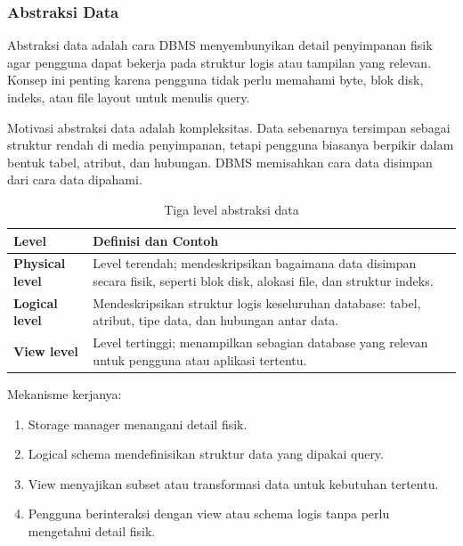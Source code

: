 \subsubsection{Abstraksi Data}

\begin{jawab}
Abstraksi data adalah cara DBMS menyembunyikan detail penyimpanan fisik agar pengguna dapat bekerja pada struktur logis atau tampilan yang relevan. Konsep ini penting karena pengguna tidak perlu memahami byte, blok disk, indeks, atau file layout untuk menulis query.
\end{jawab}

Motivasi abstraksi data adalah kompleksitas. Data sebenarnya tersimpan sebagai struktur rendah di media penyimpanan, tetapi pengguna biasanya berpikir dalam bentuk tabel, atribut, dan hubungan. DBMS memisahkan cara data disimpan dari cara data dipahami.

\begin{table}[H]
\centering
\begin{tabularx}{\textwidth}{|L{0.22\textwidth}|X|}
\hline
\textbf{Level} & \textbf{Definisi dan Contoh} \\
\hline
\textbf{Physical level} & Level terendah; mendeskripsikan bagaimana data disimpan secara fisik, seperti blok disk, alokasi file, dan struktur indeks. \\
\hline
\textbf{Logical level} & Mendeskripsikan struktur logis keseluruhan database: tabel, atribut, tipe data, dan hubungan antar data. \\
\hline
\textbf{View level} & Level tertinggi; menampilkan sebagian database yang relevan untuk pengguna atau aplikasi tertentu. \\
\hline
\end{tabularx}
\caption{Tiga level abstraksi data}
\label{tab:data-abstraction-levels}
\end{table}

Mekanisme kerjanya:
\begin{enumerate}
    \item Storage manager menangani detail fisik.
    \item Logical schema mendefinisikan struktur data yang dipakai query.
    \item View menyajikan subset atau transformasi data untuk kebutuhan tertentu.
    \item Pengguna berinteraksi dengan view atau schema logis tanpa perlu mengetahui detail fisik.
\end{enumerate}

